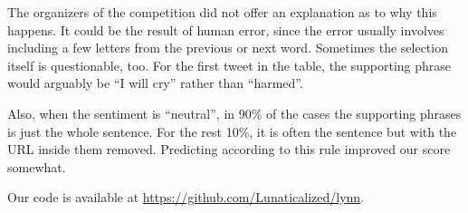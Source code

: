 The organizers of the competition did not offer an explanation as to
why this happens.  It could be the result of human error, since the
error usually involves including a few letters from the previous or
next word.  Sometimes the selection itself is questionable, too.  For the
first tweet in the table, the supporting phrase would arguably be ``I
will cry'' rather than ``harmed''.

Also, when the sentiment is ``neutral'', in 90\% of the cases the
supporting phrases is just the whole sentence.  For the rest 10\%, it
is often the sentence but with the URL inside them removed.
Predicting according to this rule improved our score somewhat.

Our code is available at \url{https://github.com/Lunaticalized/lynn}.
